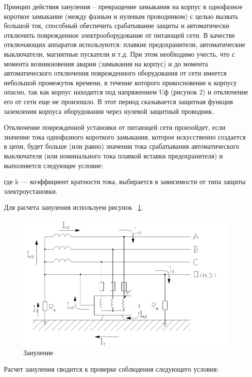 Принцип действия зануления – превращение замыкания на корпус в однофазное короткое замыкание (между фазным и нулевым проводником) с целью вызвать большой ток, способный обеспечить срабатывание защиты и автоматически отключить поврежденное электрооборудование от питающей сети. В качестве отключающих аппаратов используются: плавкие предохранители, автоматические выключатели, магнитные пускатели и т.д. При этом необходимо учесть, что с момента возникновения аварии (замыкания на корпус) и до момента автоматического отключения поврежденного оборудования от сети имеется небольшой промежуток времени, в течение которого прикосновение к корпусу опасно, так как корпус находится под напряжением Uф  (рисунок 2)  и отключение его от сети еще не произошло. В этот период сказывается защитная функция заземления корпуса оборудования через нулевой защитный проводник.

Отключение поврежденной установки от питающей сети произойдет, если значение тока однофазного короткого замыкания, которое искусственно создается в цепи, будет больше (или равно) значения тока срабатывания автоматического выключателя (или номинального тока плавкой вставки предохранителя) и выполняется следующее условие:

где k --- коэффициент кратности тока, выбирается в зависимости от типа защиты электроустановки.

Для расчета зануления используем рисунок ~\ref{fig:ot-zanul2}.

\begin{figure}
  	\centering
  	\includegraphics[width=1\textwidth]{images/ot-zanul2.png}
  	\caption{Зануление}
    \label{fig:ot-zanul2}
\end{figure}

Расчет зануления сводится к проверке соблюдения следующего условия:

